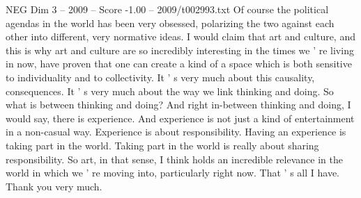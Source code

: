 \begin{textsample}{NEG Dim 3 – 2009 – Score -1.00 – 2009/t002993.txt}
Of course the political agendas in the world has been very obsessed, polarizing the two against each other into different, very normative ideas.
I would claim that art and culture, and this is why art and culture are so incredibly interesting in the times we ' re living in now, have proven that one can create a kind of a space which is both sensitive to individuality and to collectivity.
It ' s very much about this causality, consequences.
It ' s very much about the way we link thinking and doing.
So what is between thinking and doing?
And right in-between thinking and doing, I would say, there is experience.
And experience is not just a kind of entertainment in a non-casual way.
Experience is about responsibility.
Having an experience is taking part in the world.
Taking part in the world is really about sharing responsibility.
So art, in that sense, I think holds an incredible relevance in the world in which we ' re moving into, particularly right now.
That ' s all I have.
Thank you very much.

\end{textsample}
